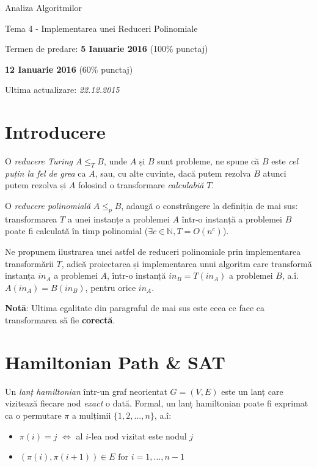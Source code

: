 \documentclass[12pt]{article}
\begin{document}
\begin{titlepage}
  \centering
  \vspace*{2cm}
  {\Large Analiza Algoritmilor}

  {\Large Tema 4 - Implementarea unei Reduceri Polinomiale}
  \vspace{2cm}

  {\large Termen de predare: {\bf 5 Ianuarie 2016} (100\% punctaj)}

  {\large \hspace{4.2cm} {\bf 12 Ianuarie 2016} (60\% punctaj)}
  \vspace{1cm}

  Ultima actualizare: \color{red} \emph{22.12.2015}

  \vfill
\end{titlepage}

\section{Introducere}
O \emph{reducere Turing} $A \leq_T B$, unde $A$ și $B$ sunt probleme,
ne spune că $B$ este \emph{cel puțin la fel de grea} ca $A$, sau, cu alte
cuvinte, dacă putem rezolva $B$ atunci putem rezolva și $A$ folosind o
transformare \emph{calculabiă} $T$.

O \emph{reducere polinomială}\cite{1} $A \leq_p B$, adaugă o
constrângere la definiția de mai sus: transformarea $T$ a unei instanțe a
problemei $A$ într-o instanță a problemei $B$ poate fi calculată în timp
polinomial ($\exists c \in \mathbb{N}, T = O(n^c)$).

Ne propunem ilustrarea unei astfel de reduceri polinomiale prin implementarea
transformării $T$, adică proiectarea și implementarea unui algoritm care
transformă instanța $in_A$ a problemei $A$, într-o instanță $in_B = T(in_A)$ a
problemei $B$, a.î. $A(in_A) = B(in_B)$, pentru orice $in_A$.

{\bf Notă}: Ultima egalitate din paragraful de mai sus este ceea ce face ca
transformarea să fie {\bf corectă}.

\section{Hamiltonian Path \& SAT}
Un \emph{lanț hamiltonian}\cite{2} într-un graf neorientat $G = (V, E)$ este un
lanț care vizitează fiecare nod \emph{exact} o dată.
Formal, un lanț hamiltonian poate fi exprimat ca o permutare $\pi$ a mulțimii
$\{1, 2, ..., n\}$, a.î:

\begin{itemize}
  \setlength{\itemsep}{0em}
  \item $\pi(i) = j$ $\iff$ al $i$-lea nod vizitat este nodul $j$
  \item $(\pi(i), \pi(i + 1)) \in E \mbox{ for } i = 1,...,n-1$
\end{itemize}
\end{document}
